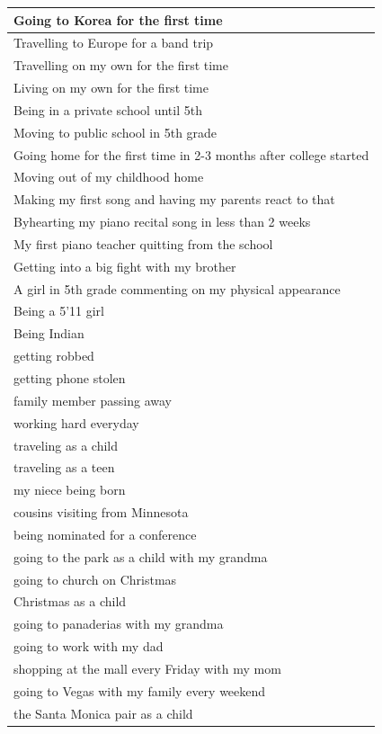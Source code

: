 \documentclass[
  .7em,
  letterpaper,
  DIV=11,
  numbers=noendperiod]{scrartcl}
\begin{document}
\begin{table}
\begin{tabular}{l}
\hline
Going to Korea for the first time\\
\hline
Travelling to Europe for a band trip\\
\hline
Travelling on my own for the first time\\
\hline
Living on my own for the first time\\
\hline
Being in a private school until 5th\\
\hline
Moving to public school in 5th grade\\
\hline
Going home for the first time in 2-3 months after college started\\
\hline
Moving out of my childhood home\\
\hline
Making my first song and having my parents react to that\\
\hline
Byhearting my piano recital song in less than 2 weeks\\
\hline
My first piano teacher quitting from the school\\
\hline
Getting into a big fight with my brother\\
\hline
A girl in 5th grade commenting on my physical appearance\\
\hline
Being a 5'11 girl\\
\hline
Being Indian\\
\hline
getting robbed\\
\hline
getting phone stolen\\
\hline
family member passing away\\
\hline
working hard everyday\\
\hline
traveling as a child\\
\hline
traveling as a teen\\
\hline
my niece being born\\
\hline
cousins visiting from Minnesota\\
\hline
being nominated for a conference\\
\hline
going to the park as a child with my grandma\\
\hline
going to church on Christmas\\
\hline
Christmas as a child\\
\hline
going to panaderias with my grandma\\
\hline
going to work with my dad\\
\hline
shopping at the mall every Friday with my mom\\
\hline
going to Vegas with my family every weekend\\
\hline
the Santa Monica pair as a child\\

\end{tabular}
\end{table}
\end{document}
